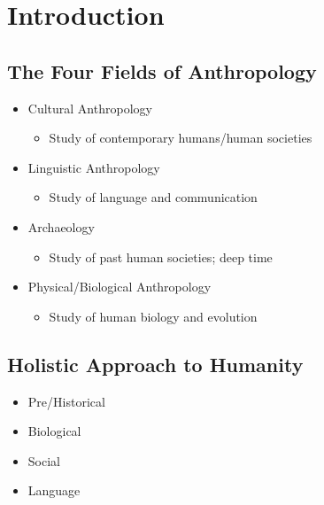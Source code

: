 \documentclass[a4paper]{article}
\begin{document}
\section{Introduction} %
\subsection{The Four Fields of Anthropology}
\begin{itemize}
  \item Cultural Anthropology \begin{itemize}
    \item Study of contemporary humans/human societies
  \end{itemize}

  \item Linguistic Anthropology \begin{itemize}
    \item Study of language and communication
  \end{itemize}

  \item Archaeology \begin{itemize}
    \item Study of past human societies; deep time
  \end{itemize}

  \item Physical/Biological Anthropology \begin{itemize}
    \item Study of human biology and evolution
  \end{itemize}
\end{itemize}

\subsection{Holistic Approach to Humanity}
\begin{itemize}
  \item Pre/Historical
  \item Biological
  \item Social
  \item Language
\end{itemize}
\end{document}

